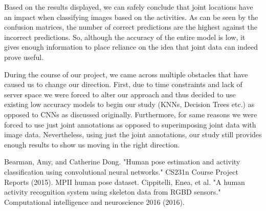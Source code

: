 \documentclass[conference]{IEEEtran}
\begin{document}
Based on the results displayed, we can safely conclude that joint locations have an impact when classifying images based on the activities. As can be seen by the confusion matrices, the number of correct predictions are the highest against the incorrect predictions. So, although the accuracy of the entire model is low, it gives enough information to place reliance on the idea that joint data can indeed prove useful.

During the course of our project, we came across multiple obstacles that have caused us to change our direction. First, due to time constraints and lack of server space we were forced to alter our approach and thus decided to use existing low accuracy models to begin our study (KNNs, Decision Trees etc.) as opposed to CNNs as discussed originally. Furthermore, for same reasons we were forced to use just joint annotations as opposed to superimposing joint data with image data. Nevertheless, using just the joint annotations, our study still provides enough results to show us moving in the right direction.


\begin{thebibliography}{00}
 Bearman, Amy, and Catherine Dong. "Human pose estimation and activity classification using convolutional neural networks." CS231n Course Project Reports (2015).
 MPII human pose dataset.
 Cippitelli, Enea, et al. "A human activity recognition system using skeleton data from RGBD sensors." Computational intelligence and neuroscience 2016 (2016).

\end{thebibliography}
\vspace{12pt}
\end{document}
